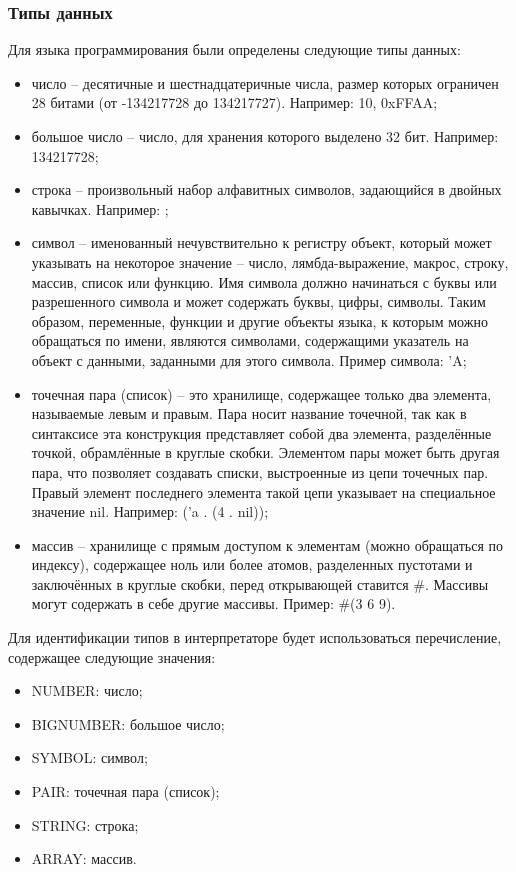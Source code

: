 \subsubsection{Типы данных}
Для языка программирования были определены следующие типы данных:
\begin{itemize}
	\item число -- десятичные и шестнадцатеричные числа, размер которых ограничен 28 битами (от -134217728 до 134217727). Например: 10, 0xFFAA;
	
	\item большое число -- число, для хранения которого выделено 32 бит. Например: 134217728;
	
	\item строка -- произвольный набор алфавитных символов, задающийся в двойных кавычках. Например: ;
	
	\item символ -- именованный нечувствительно к регистру объект, который может указывать на некоторое значение -- число, лямбда-выражение, макрос, строку, массив, список или функцию. Имя символа должно начинаться с буквы или разрешенного символа и может содержать буквы, цифры, символы. Таким образом, переменные, функции и другие объекты языка, к которым можно обращаться по имени, являются символами, содержащими указатель на объект с данными, заданными для этого символа. Пример символа: 'A;
	
	\item точечная пара (список) -- это хранилище, содержащее только два элемента, называемые левым и правым. Пара носит название точечной, так как в синтаксисе эта конструкция представляет собой два элемента, разделённые точкой, обрамлённые в круглые скобки. Элементом пары может быть другая пара, что позволяет создавать списки, выстроенные из цепи точечных пар. Правый элемент последнего элемента такой цепи указывает на специальное значение nil. Например: ('a . (4 . nil));
	
	\item массив -- хранилище с прямым доступом к элементам (можно обращаться по индексу), содержащее ноль или более атомов, разделенных пустотами и заключённых в круглые скобки, перед открывающей ставится \#. Массивы могут содержать в себе другие массивы. Пример: \#(3 6 9).
\end{itemize}

Для идентификации типов в интерпретаторе будет использоваться перечисление, содержащее следующие значения:
\begin{itemize}
	\item NUMBER: число;
	\item BIGNUMBER: большое число;
	\item SYMBOL: символ;
	\item PAIR: точечная пара (список);
	\item STRING: строка;
	\item ARRAY: массив.
\end{itemize}

